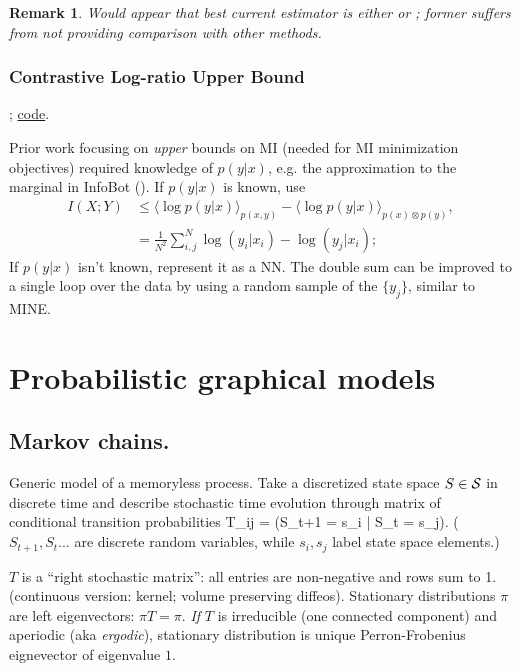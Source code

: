 \documentclass[notitlepage,openany,11pt]{report}
\theoremstyle{plain}%
\newtheorem{notethm}{Remark}
\newenvironment{notebox}
    {\noindent\colorlet{shadecolor}{cyan!15}\begin{shaded}\begin{notethm}}
    {\end{notethm}\end{shaded}}
\numberwithin{equation}{section}
\begin{document}
\begin{notebox}
Would appear that best current estimator is either \cite{ChanEtAl:19} or \cite{ChoiLee:20}; former suffers from not providing comparison with other methods.
\end{notebox}

\subsubsection{Contrastive Log-ratio Upper Bound}
\cite{ChengEtAl:20}; \href{https://github.com/Linear95/CLUB}{code}.

Prior work focusing on \emph{upper} bounds on MI (needed for MI minimization objectives) required knowledge of $p(y|x)$, e.g. the approximation to the marginal in InfoBot (). If $p(y|x)$ is known, use
\begin{align*}
I(X;Y) &\leq \langle \log p(y|x) \rangle_{p(x,y)} - \langle \log p(y|x) \rangle_{p(x) \otimes p(y)}, \\
{} &= \frac{1}{N^2} \sum_{i,j}^{N} \log(y_i|x_i) - \log(y_j|x_i);
\end{align*}
If $p(y|x)$ isn't known, represent it as a NN. The double sum can be improved to a single loop over the data by using a random sample of the $\{ y_{j} \}$, similar to MINE. 





\section{Probabilistic graphical models}

\subsection{Markov chains.} 
Generic model of a memoryless process. Take a discretized state space $S \in \mathcal{S}$ in discrete time and describe stochastic time evolution through matrix of conditional transition probabilities
\be
T_{ij} = (S_{t+1} = s_{i} | S_{t} = s_{j}).
\ee
($S_{t+1}, S_{t}...$ are discrete random variables, while $s_{i}, s_{j}$ label state space elements.)

$T$ is a ``right stochastic matrix'': all entries are non-negative and rows sum to 1. (continuous version: kernel; volume preserving diffeos). Stationary distributions $\pi$ are left eigenvectors: $\pi T = \pi$. \emph{If} $T$ is irreducible (one connected component) and aperiodic (aka \emph{ergodic}), stationary distribution is unique Perron-Frobenius eignevector of eigenvalue $1$.
\end{document}
